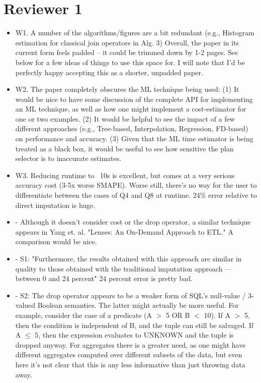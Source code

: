 \documentclass[draft,12pt]{article}
\begin{document}
\section{Reviewer 1}
\begin{itemize}
\item W1. A number of the algorithms/figures are a bit redundant (e.g., Histogram estimation for classical join operators in Alg. 3) Overall, the paper in its current form feels padded -- it could be trimmed down by 1-2 pages. See below for a few ideas of things to use this space for. I will note that I'd be perfectly happy accepting this as a shorter, unpadded paper.

\item W2. The paper completely obscures the ML technique being used: (1) It would be nice to have some discussion of the complete API for implementing an ML technique, as well as how one might implement a cost-estimator for one or two examples. (2) It would be helpful to see the impact of a few different approaches (e.g., Tree-based, Interpolation, Regression, FD-based) on performance and accuracy. (3) Given that the ML time estimator is being treated as a black box, it would be useful to see how sensitive the plan selector is to inaccurate estimates.

\item W3. Reducing runtime to ~10s is excellent, but comes at a very serious accuracy cost (3-5x worse SMAPE). Worse still, there's no way for the user to differentiate between the cases of Q4 and Q8 at runtime. 24\% error relative to direct imputation is huge.

\item - Although it doesn't consider cost or the drop operator, a similar technique appears in Yang et. al. "Lenses: An On-Demand Approach to ETL." A comparison would be nice.

\item - S1: "Furthermore, the results obtained with this approach are similar in quality to those obtained with the traditional imputation approach — between 0 and 24 percent" 24 percent error is pretty bad. 

\item - S2: The drop operator appears to be a weaker form of SQL's null-value / 3-valued Boolean semantics. The latter might actually be more useful. For example, consider the case of a predicate (A $>$ 5 OR B $<$ 10). If A $>$ 5, then the condition is independent of B, and the tuple can still be salvaged. If A $\leq$ 5, then the expression evaluates to UNKNOWN and the tuple is dropped anyway. For aggregates there is a greater need, as one might have different aggregates computed over different subsets of the data, but even here it's not clear that this is any less informative than just throwing data away. 


\end{itemize}
\end{document}
